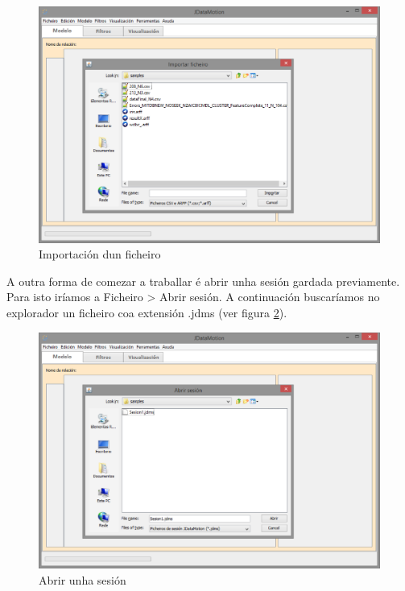 \begin{figure}
\centering
\includegraphics[width=\textwidth,height=\textheight,keepaspectratio]{figuras/importarFicheiro}
\caption{Importación dun ficheiro}
\label{importarFicheiro}
\end{figure}

A outra forma de comezar a traballar é abrir unha sesión gardada previamente. Para isto iríamos a Ficheiro \textgreater{} Abrir sesión. A continuación buscaríamos no explorador un ficheiro coa extensión .jdms (ver figura \ref{abrirSesion}).

\begin{figure}
\centering
\includegraphics[width=\textwidth,height=\textheight,keepaspectratio]{figuras/abrirSesion}
\caption{Abrir unha sesión}
\label{abrirSesion}
\end{figure}

